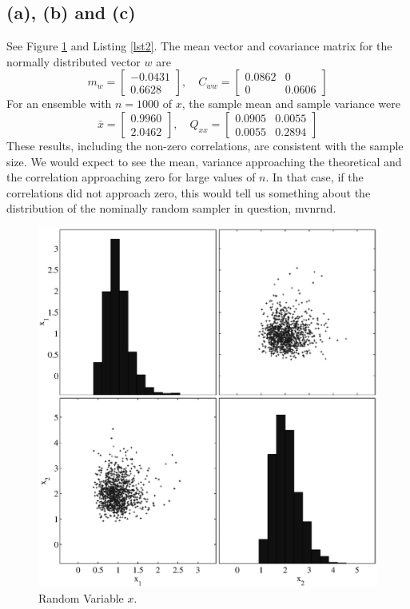 \documentclass[fleqn, letterpaper]{tufte-handout}
\begin{document}
\subsection{(a), (b) and (c)}
See Figure \ref{norm} and Listing \ref{lst2}. The mean vector and covariance matrix for the normally distributed vector $w$ are
\[
m_w=\begin{bmatrix} -0.0431 \\ 0.6628  \end{bmatrix},
\quad C_{ww} = \begin{bmatrix} 0.0862 & 0 \\ 0 & 0.0606 \end{bmatrix}
\]
For an ensemble with $n=1000$ of $x$, the sample mean and sample variance were
\[
\bar{x}=\begin{bmatrix} 0.9960 \\ 2.0462  \end{bmatrix},
\quad Q_{xx} = \begin{bmatrix} 0.0905 & 0.0055 \\ 0.0055 & 0.2894 \end{bmatrix}
\]
These results, including the non-zero correlations, are consistent with the sample size. We would expect to see the mean, variance approaching the theoretical and the correlation approaching zero for large values of $n$. In that case, if the correlations did not approach zero, this would tell us something about the distribution of the nominally random sampler in question, {\ttfamily mvnrnd}.
\begin{figure}
        \includegraphics[width=\textwidth]{problem2}
        \caption{Random Variable $x$.  }
        \label{norm}
\end{figure}
{\small
\begin{minipage}{\linewidth}
        
\end{minipage}
}
\end{document}
